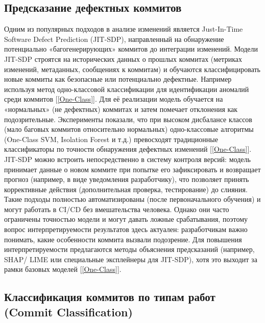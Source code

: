 \subsection{Предсказание дефектных коммитов}
Одним из популярных подходов в анализе изменений является Just-In-Time Software Defect Prediction (JIT-SDP), направленный на обнаружение потенциально «багогенерирующих» коммитов до интеграции изменений. Модели JIT-SDP строятся на исторических данных о прошлых коммитах (метриках изменений, метаданных, сообщениях к коммитам) и обучаются классифицировать новые коммиты как безопасные или потенциально дефектные. Например используя метод одно-классовой классификации для идентификации аномалий среди коммитов [\ref{One-Class}]. Для её реализации модель обучается на «нормальных» (не дефектных) коммитах и затем помечает отклонения как подозрительные. Эксперименты показали, что при высоком дисбалансе классов (мало баговых коммитов относительно нормальных) одно-классовые алгоритмы (One-Class SVM, Isolation Forest и т.д.) превосходят традиционные классификаторы по точности обнаружения дефектных изменений [\ref{One-Class}]. JIT-SDP можно встроить непосредственно в систему контроля версий: модель принимает данные о новом коммите при попытке его зафиксировать и возвращает прогноз (например, в виде уведомления разработчику), что позволяет принять коррективные действия (дополнительная проверка, тестирование) до слияния. Такие подходы полностью автоматизированы (после первоначального обучения) и могут работать в CI/CD без вмешательства человека. Однако они часто ограничены точностью модели и могут давать ложные срабатывания, поэтому вопрос интерпретируемости результатов здесь актуален: разработчикам важно понимать, какие особенности коммита вызвали подозрение. Для повышения интерпретируемости предлагаются методы объяснения предсказаний (например, SHAP/ LIME или специальные эксплейнеры для JIT-SDP), хотя это выходит за рамки базовых моделей [\ref{One-Class}]. 

\subsection{Классификация коммитов по типам работ (Commit Classification)}

